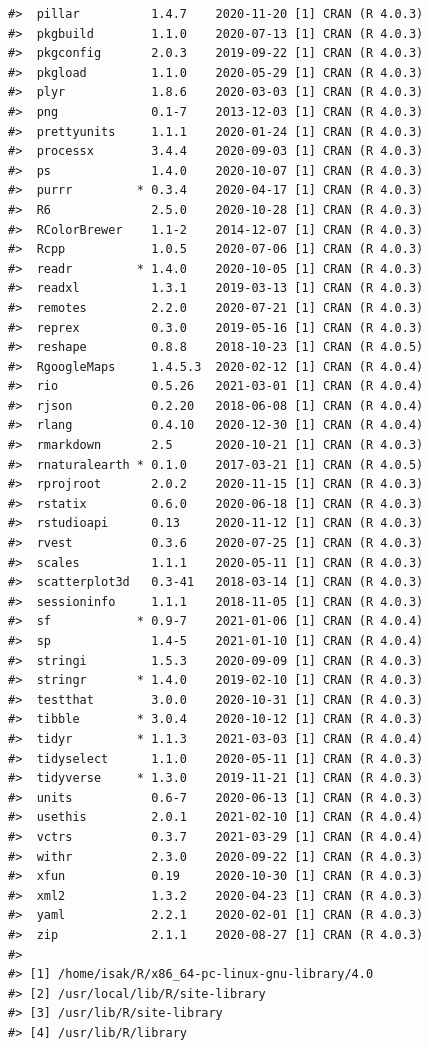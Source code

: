 \documentclass[
]{article}
\begin{document}
\begin{verbatim}
#>  pillar          1.4.7    2020-11-20 [1] CRAN (R 4.0.3)
#>  pkgbuild        1.1.0    2020-07-13 [1] CRAN (R 4.0.3)
#>  pkgconfig       2.0.3    2019-09-22 [1] CRAN (R 4.0.3)
#>  pkgload         1.1.0    2020-05-29 [1] CRAN (R 4.0.3)
#>  plyr            1.8.6    2020-03-03 [1] CRAN (R 4.0.3)
#>  png             0.1-7    2013-12-03 [1] CRAN (R 4.0.3)
#>  prettyunits     1.1.1    2020-01-24 [1] CRAN (R 4.0.3)
#>  processx        3.4.4    2020-09-03 [1] CRAN (R 4.0.3)
#>  ps              1.4.0    2020-10-07 [1] CRAN (R 4.0.3)
#>  purrr         * 0.3.4    2020-04-17 [1] CRAN (R 4.0.3)
#>  R6              2.5.0    2020-10-28 [1] CRAN (R 4.0.3)
#>  RColorBrewer    1.1-2    2014-12-07 [1] CRAN (R 4.0.3)
#>  Rcpp            1.0.5    2020-07-06 [1] CRAN (R 4.0.3)
#>  readr         * 1.4.0    2020-10-05 [1] CRAN (R 4.0.3)
#>  readxl          1.3.1    2019-03-13 [1] CRAN (R 4.0.3)
#>  remotes         2.2.0    2020-07-21 [1] CRAN (R 4.0.3)
#>  reprex          0.3.0    2019-05-16 [1] CRAN (R 4.0.3)
#>  reshape         0.8.8    2018-10-23 [1] CRAN (R 4.0.5)
#>  RgoogleMaps     1.4.5.3  2020-02-12 [1] CRAN (R 4.0.4)
#>  rio             0.5.26   2021-03-01 [1] CRAN (R 4.0.4)
#>  rjson           0.2.20   2018-06-08 [1] CRAN (R 4.0.4)
#>  rlang           0.4.10   2020-12-30 [1] CRAN (R 4.0.4)
#>  rmarkdown       2.5      2020-10-21 [1] CRAN (R 4.0.3)
#>  rnaturalearth * 0.1.0    2017-03-21 [1] CRAN (R 4.0.5)
#>  rprojroot       2.0.2    2020-11-15 [1] CRAN (R 4.0.3)
#>  rstatix         0.6.0    2020-06-18 [1] CRAN (R 4.0.3)
#>  rstudioapi      0.13     2020-11-12 [1] CRAN (R 4.0.3)
#>  rvest           0.3.6    2020-07-25 [1] CRAN (R 4.0.3)
#>  scales          1.1.1    2020-05-11 [1] CRAN (R 4.0.3)
#>  scatterplot3d   0.3-41   2018-03-14 [1] CRAN (R 4.0.3)
#>  sessioninfo     1.1.1    2018-11-05 [1] CRAN (R 4.0.3)
#>  sf            * 0.9-7    2021-01-06 [1] CRAN (R 4.0.4)
#>  sp              1.4-5    2021-01-10 [1] CRAN (R 4.0.4)
#>  stringi         1.5.3    2020-09-09 [1] CRAN (R 4.0.3)
#>  stringr       * 1.4.0    2019-02-10 [1] CRAN (R 4.0.3)
#>  testthat        3.0.0    2020-10-31 [1] CRAN (R 4.0.3)
#>  tibble        * 3.0.4    2020-10-12 [1] CRAN (R 4.0.3)
#>  tidyr         * 1.1.3    2021-03-03 [1] CRAN (R 4.0.4)
#>  tidyselect      1.1.0    2020-05-11 [1] CRAN (R 4.0.3)
#>  tidyverse     * 1.3.0    2019-11-21 [1] CRAN (R 4.0.3)
#>  units           0.6-7    2020-06-13 [1] CRAN (R 4.0.3)
#>  usethis         2.0.1    2021-02-10 [1] CRAN (R 4.0.4)
#>  vctrs           0.3.7    2021-03-29 [1] CRAN (R 4.0.4)
#>  withr           2.3.0    2020-09-22 [1] CRAN (R 4.0.3)
#>  xfun            0.19     2020-10-30 [1] CRAN (R 4.0.3)
#>  xml2            1.3.2    2020-04-23 [1] CRAN (R 4.0.3)
#>  yaml            2.2.1    2020-02-01 [1] CRAN (R 4.0.3)
#>  zip             2.1.1    2020-08-27 [1] CRAN (R 4.0.3)
#> 
#> [1] /home/isak/R/x86_64-pc-linux-gnu-library/4.0
#> [2] /usr/local/lib/R/site-library
#> [3] /usr/lib/R/site-library
#> [4] /usr/lib/R/library
\end{verbatim}
\end{document}
